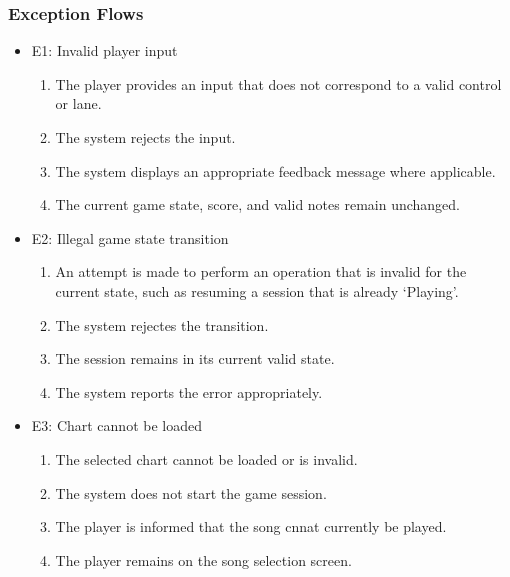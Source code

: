\documentclass[12pt,a4paper]{article}
\begin{document}
            \subsubsection{Exception Flows}
                \begin{itemize}
                    \item E1: Invalid player input
                    \begin{enumerate}
                        \item The player provides an input that does not correspond to a valid control or lane.
                        \item The system rejects the input.
                        \item The system displays an appropriate feedback message where applicable.
                        \item The current game state, score, and valid notes remain unchanged.
                    \end{enumerate}
                    \item E2: Illegal game state transition
                    \begin{enumerate}
                        \item An attempt is made to perform an operation that is invalid for the current state, such as resuming a session that is already `Playing'.
                        \item The system rejectes the transition.
                        \item The session remains in its current valid state.
                        \item The system reports the error appropriately.
                    \end{enumerate}
                    \item E3: Chart cannot be loaded
                    \begin{enumerate}
                        \item The selected chart cannot be loaded or is invalid.
                        \item The system does not start the game session.
                        \item The player is informed that the song cnnat currently be played.
                        \item The player remains on the song selection screen.
                    \end{enumerate}
                \end{itemize}
            
\end{document}
